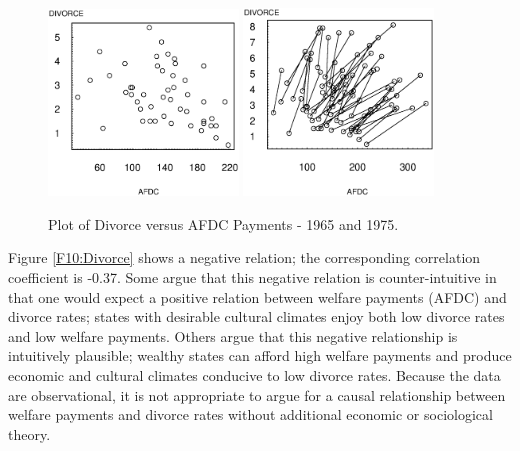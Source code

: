 \begin{figure}[htp]
  \begin{center}
    \includegraphics[width=0.45\textwidth]
        {Chapter10LongData/F10Divorce65.eps}
      \hfill
            \includegraphics[width=0.45\textwidth]
       {Chapter10LongData/F10DivorcePanel.eps}
      \end{center}
           \parbox[t]{2.5in}{\caption {\label{F10:Divorce}
           {\small Plot of 1965 Divorce versus AFDC Payments.}}} \hfill
        \parbox[t]{2.5in}{\caption {\label{F10:Divorce2}
           {\small Plot of Divorce versus AFDC Payments - 1965 and
           1975.}}}
\end{figure}



Figure \ref{F10:Divorce} shows a negative relation; the
corresponding correlation coefficient is -0.37. Some argue that this
negative relation is counter-intuitive in that one would expect a
positive relation between welfare payments (AFDC) and divorce rates;
states with desirable cultural climates enjoy both low divorce rates
and low welfare payments. Others argue that this negative
relationship is intuitively plausible; wealthy states can afford
high welfare payments and produce economic and cultural climates
conducive to low divorce rates. Because the data are observational,
it is not appropriate to argue for a causal relationship between
welfare payments and divorce rates without additional economic or
sociological theory.

